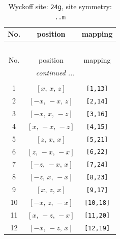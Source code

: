 \documentclass[fleqn,8pt]{jsarticle}
\begin{document}
\begin{longtable}{ccc}
\caption{Wyckoff site: {\tt 24g}, site symmetry: {\tt ..m}}
 \\
 \hline \hline
No. & position & mapping \\ \hline \endfirsthead

\multicolumn{2}{l}{\tablename\ \thetable{}} \\
 \hline \hline
No. & position & mapping \\ \hline \endhead

 \hline \hline
\multicolumn{2}{r}{\footnotesize\it continued ...} \\ \endfoot

 \hline \hline
\multicolumn{2}{r}{} \\ \endlastfoot

1 & $\left[ x,\, x,\, z \right]$ & {\tt [1,13]} \\ \hline
2 & $\left[ - x,\, - x,\, z \right]$ & {\tt [2,14]} \\ \hline
3 & $\left[ - x,\, x,\, - z \right]$ & {\tt [3,16]} \\ \hline
4 & $\left[ x,\, - x,\, - z \right]$ & {\tt [4,15]} \\ \hline
5 & $\left[ z,\, x,\, x \right]$ & {\tt [5,21]} \\ \hline
6 & $\left[ z,\, - x,\, - x \right]$ & {\tt [6,22]} \\ \hline
7 & $\left[ - z,\, - x,\, x \right]$ & {\tt [7,24]} \\ \hline
8 & $\left[ - z,\, x,\, - x \right]$ & {\tt [8,23]} \\ \hline
9 & $\left[ x,\, z,\, x \right]$ & {\tt [9,17]} \\ \hline
10 & $\left[ - x,\, z,\, - x \right]$ & {\tt [10,18]} \\ \hline
11 & $\left[ x,\, - z,\, - x \right]$ & {\tt [11,20]} \\ \hline
12 & $\left[ - x,\, - z,\, x \right]$ & {\tt [12,19]} \\
\end{longtable}
\renewcommand{\arraystretch}{1.2}
\end{document}
